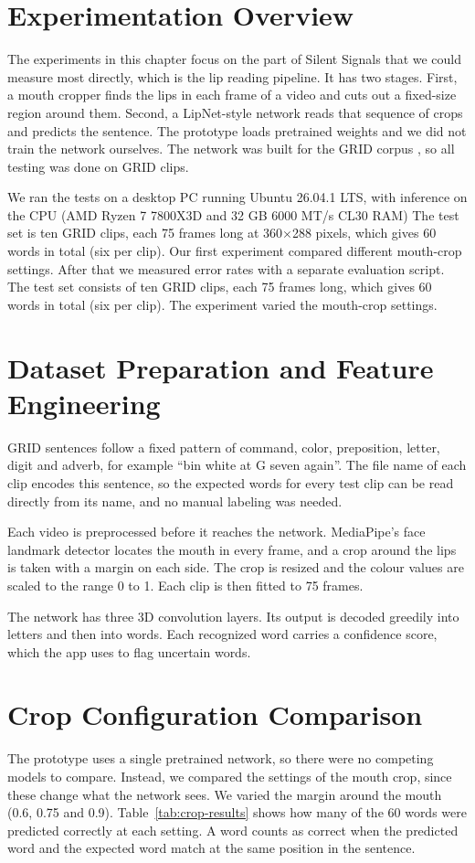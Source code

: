 \documentclass{FastFyp}
\begin{document}
\section{Experimentation Overview}
The experiments in this chapter focus on the part of Silent Signals that we could measure most directly, which is the lip reading pipeline. It has two stages. First, a mouth cropper finds the lips in each frame of a video and cuts out a fixed-size region around them. Second, a LipNet-style network \cite{assael2016lipnet} reads that sequence of crops and predicts the sentence. The prototype loads pretrained weights and we did not train the network ourselves. \cite{LipNetGitHub} The network was built for the GRID corpus \cite{cooke2006grid}, so all testing was done on GRID clips.

We ran the tests on a desktop PC running Ubuntu 26.04.1 LTS, with inference on the CPU (AMD Ryzen 7 7800X3D and 32 GB 6000 MT/s CL30 RAM) The test set is ten GRID clips, each 75 frames long at 360$\times$288 pixels, which gives 60 words in total (six per clip). Our first experiment compared different mouth-crop settings. After that we measured error rates with a separate evaluation script. The test set consists of ten GRID clips, each 75 frames long, which gives 60 words in total (six per clip). The experiment varied the mouth-crop settings.

\section{Dataset Preparation and Feature Engineering}
GRID sentences follow a fixed pattern of command, color, preposition, letter, digit and adverb, for example ``bin white at G seven again''. The file name of each clip encodes this sentence, so the expected words for every test clip can be read directly from its name, and no manual labeling was needed.

Each video is preprocessed before it reaches the network. MediaPipe's face landmark detector locates the mouth in every frame, and a crop around the lips is taken with a margin on each side. The crop is resized and the colour values are scaled to the range 0 to 1. Each clip is then fitted to 75 frames.

The network has three 3D convolution layers. Its output is decoded greedily into letters and then into words. Each recognized word carries a confidence score, which the app uses to flag uncertain words.

\section{Crop Configuration Comparison}
The prototype uses a single pretrained network, so there were no competing models to compare. Instead, we compared the settings of the mouth crop, since these change what the network sees. We varied the margin around the mouth (0.6, 0.75 and 0.9). Table~\ref{tab:crop-results} shows how many of the 60 words were predicted correctly at each setting. A word counts as correct when the predicted word and the expected word match at the same position in the sentence.
\end{document}
